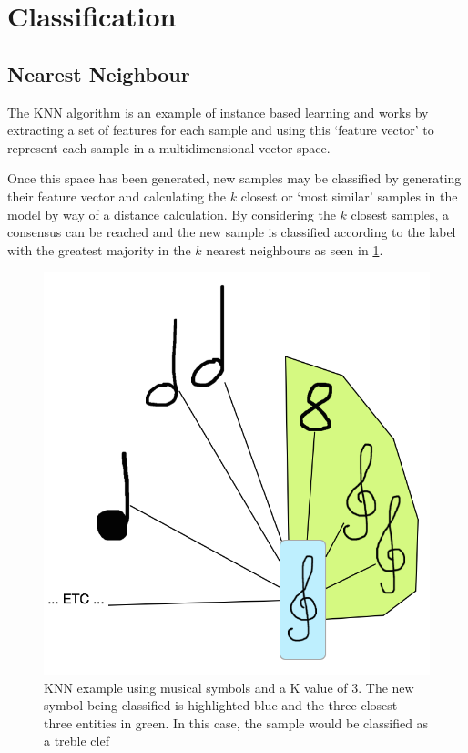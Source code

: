 \section{Classification}

\subsection{Nearest Neighbour}

The \acrfull{KNN} algorithm is an example of instance based learning and works by extracting a set of features for each sample and using this `feature vector' to represent each sample in a multidimensional vector space.

Once this space has been generated, new samples may be classified by generating their feature vector and calculating the $k$ closest or `most similar' samples in the model by way of a distance calculation. By considering the $k$ closest samples, a consensus can be reached and the new sample is classified according to the label with the greatest majority in the $k$ nearest neighbours as seen in \cref{fig:knn-example}.

 \begin{figure}[h!]
   \centering
   \includegraphics{gfx/techniques/knn-entities.png}
   \caption{KNN example using musical symbols and a K value of 3. The new symbol being classified is highlighted blue and the three closest three entities in green. In this case, the sample would be classified as a treble clef}
   \label{fig:knn-example}
 \end{figure}

